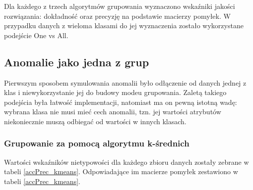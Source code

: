 \documentclass[11pt,a4paper,twoside]{article}
\begin{document}
Dla każdego z trzech algorytmów grupowania wyznaczono wskaźniki jakości rozwiązania: dokładność oraz precyzję na podstawie macierzy pomyłek. W przypadku danych z wieloma klasami do jej wyznaczenia zostało wykorzystane podejście One vs All.


\subsection{Anomalie jako jedna z grup}

Pierwszym sposobem symulowania anomalii było odłączenie od danych jednej z klas i niewykorzystanie jej do budowy modeu grupowania. Zaletą takiego podejścia była łatwość implementacji, natomiast ma on pewną istotną wadę: wybrana klasa nie musi mieć cech anomalii, tzn. jej wartości atrybutów niekoniecznie muszą odbiegać od wartości w innych klasach.


\subsubsection{Grupowanie za pomocą algorytmu k-średnich }
Wartości wskaźników nietypowości dla każdego zbioru danych zostały zebrane w tabeli \ref{accPrec_kmeans}. Odpowiadające im macierze pomyłek zestawiono w tabeli \ref{accPrec_kmeans}.
\end{document}
